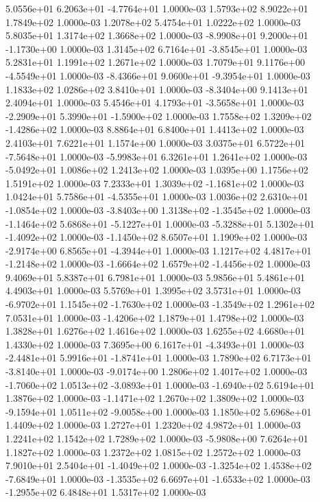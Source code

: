 5.0556e+01  6.2063e+01 -4.7764e+01  1.0000e-03
1.5793e+02 8.9022e+01 1.7849e+02  1.0000e-03
1.2078e+02 5.4754e+01 1.0222e+02  1.0000e-03
5.8035e+01 1.3174e+02 1.3668e+02  1.0000e-03
-8.9908e+01  9.2000e+01 -1.1730e+00  1.0000e-03
 1.3145e+02  6.7164e+01 -3.8545e+01  1.0000e-03
5.2831e+01 1.1991e+02 1.2671e+02  1.0000e-03
 1.7079e+01  9.1176e+00 -4.5549e+01  1.0000e-03
-8.4366e+01  9.0600e+01 -9.3954e+01  1.0000e-03
1.1833e+02 1.0286e+02 3.8410e+01  1.0000e-03
-8.3404e+00  9.1413e+01  2.4094e+01  1.0000e-03
 5.4546e+01  4.1793e+01 -3.5658e+01  1.0000e-03
-2.2909e+01  5.3990e+01 -1.5900e+02  1.0000e-03
 1.7558e+02  1.3209e+02 -1.4286e+02  1.0000e-03
8.8864e+01 6.8400e+01 1.4413e+02  1.0000e-03
2.4103e+01 7.6221e+01 1.1574e+00  1.0000e-03
 3.0375e+01  6.5722e+01 -7.5648e+01  1.0000e-03
-5.9983e+01  6.3261e+01  1.2641e+02  1.0000e-03
-5.0492e+01  1.0086e+02  1.2413e+02  1.0000e-03
1.0395e+00 1.1756e+02 1.5191e+02  1.0000e-03
 7.2333e+01  1.3039e+02 -1.1681e+02  1.0000e-03
 1.0424e+01  5.7586e+01 -4.5355e+01  1.0000e-03
 1.0036e+02  2.6310e+01 -1.0854e+02  1.0000e-03
-3.8403e+00  1.3138e+02 -1.3545e+02  1.0000e-03
-1.1464e+02  5.6868e+01 -5.1227e+01  1.0000e-03
-5.3288e+01  5.1302e+01 -1.4092e+02  1.0000e-03
-1.1450e+02  8.6507e+01  1.1909e+02  1.0000e-03
-2.9174e+00  6.8565e+01 -4.3944e+01  1.0000e-03
 1.1217e+02  4.4817e+01 -1.2148e+02  1.0000e-03
-1.6664e+02  1.6579e+02 -1.4456e+02  1.0000e-03
9.4069e+01 5.8387e+01 6.7981e+01  1.0000e-03
5.9856e+01 5.4861e+01 4.4903e+01  1.0000e-03
5.5769e+01 1.3995e+02 3.5731e+01  1.0000e-03
-6.9702e+01  1.1545e+02 -1.7630e+02  1.0000e-03
-1.3549e+02  1.2961e+02  7.0531e+01  1.0000e-03
-1.4206e+02  1.1879e+01  1.4798e+02  1.0000e-03
1.3828e+01 1.6276e+02 1.4616e+02  1.0000e-03
1.6255e+02 4.6680e+01 1.4330e+02  1.0000e-03
 7.3695e+00  6.1617e+01 -4.3493e+01  1.0000e-03
-2.4481e+01  5.9916e+01 -1.8741e+01  1.0000e-03
 1.7890e+02  6.7173e+01 -3.8140e+01  1.0000e-03
-9.0174e+00  1.2806e+02  1.4017e+02  1.0000e-03
-1.7060e+02  1.0513e+02 -3.0893e+01  1.0000e-03
-1.6940e+02  5.6194e+01  1.3876e+02  1.0000e-03
-1.1471e+02  1.2670e+02  1.3809e+02  1.0000e-03
-9.1594e+01  1.0511e+02 -9.0058e+00  1.0000e-03
1.1850e+02 5.6968e+01 1.4409e+02  1.0000e-03
1.2727e+01 1.2320e+02 4.9872e+01  1.0000e-03
1.2241e+02 1.1542e+02 1.7289e+02  1.0000e-03
-5.9808e+00  7.6264e+01  1.1827e+02  1.0000e-03
1.2372e+02 1.0815e+02 1.2572e+02  1.0000e-03
 7.9010e+01  2.5404e+01 -1.4049e+02  1.0000e-03
-1.3254e+02  1.4538e+02 -7.6849e+01  1.0000e-03
-1.3535e+02  6.6697e+01 -1.6533e+02  1.0000e-03
-1.2955e+02  6.4848e+01  1.5317e+02  1.0000e-03

